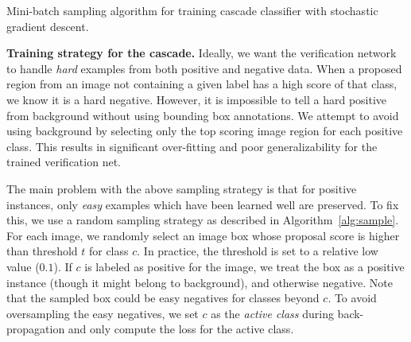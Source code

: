 \documentclass[10pt,twocolumn,letterpaper]{article}
\begin{document}
\begin{algorithm}
\caption{Mini-batch sampling algorithm for training cascade classifier with stochastic gradient descent.}
\label{alg:sample}
\end{algorithm}

\textbf{Training strategy for the cascade.} Ideally, we want the verification network to handle \textit{hard} examples from both positive and negative data. When a proposed region from an image not containing a given label has a high score of that class, we know it is a hard negative. However, it is impossible to tell a hard positive from background without using bounding box annotations. We attempt to avoid using background by selecting only the top scoring image region for each positive class. This results in significant over-fitting and poor generalizability for the trained verification net. 

The main problem with the above sampling strategy is that for positive instances, only \textit{easy} examples which have been learned well are preserved. To fix this, we use a random sampling strategy as described in Algorithm~\ref{alg:sample}. For each image, we randomly select an image box whose proposal score is higher than threshold $t$ for class $c$. In practice, the threshold is set to a relative low value (\eg $0.1$). If $c$ is labeled as positive for the image, we treat the box as a positive instance (though it might belong to background), and otherwise negative. Note that the sampled box could be easy negatives for classes beyond $c$. To avoid oversampling the easy negatives, we set $c$ as the \textit{active class} during back-propagation and only compute the loss for the active class.
\end{document}
